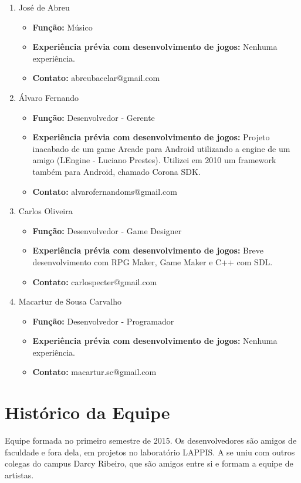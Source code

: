 \documentclass[11pt]{article}
\begin{document}
\begin{enumerate}
\item José de Abreu

\begin{itemize}
\item \textbf{Função:} Músico
\item \textbf{Experiência prévia com desenvolvimento de jogos:}
	Nenhuma experiência.
\item \textbf{Contato:} abreubacelar@gmail.com
\end{itemize}

\item Álvaro Fernando

\begin{itemize}
\item \textbf{Função:} Desenvolvedor - Gerente
\item \textbf{Experiência prévia com desenvolvimento de jogos:} 	
	Projeto inacabado de um game Arcade para Android utilizando a engine de
	um amigo (LEngine - Luciano Prestes). Utilizei em 2010 um framework também
	para Android, chamado Corona SDK.
\item \textbf{Contato:} alvarofernandoms@gmail.com
\end{itemize}

\item Carlos Oliveira

\begin{itemize}
\item \textbf{Função:} Desenvolvedor - Game Designer
\item \textbf{Experiência prévia com desenvolvimento de jogos:}
	Breve desenvolvimento com RPG Maker, Game Maker e C++ com SDL.
\item \textbf{Contato:} carlospecter@gmail.com
\end{itemize}

\item Macartur de Sousa Carvalho

\begin{itemize}
\item \textbf{Função:} Desenvolvedor - Programador
\item \textbf{Experiência prévia com desenvolvimento de jogos:}
	Nenhuma experiência.
\item \textbf{Contato:} macartur.sc@gmail.com
\end{itemize}

\end{enumerate}

\section{Histórico da Equipe}
 Equipe formada no primeiro semestre de 2015. Os desenvolvedores são amigos
 de faculdade e fora dela, em projetos no laboratório LAPPIS. A se uniu com
 outros colegas do campus Darcy Ribeiro, que são amigos entre si e formam a
 equipe de artistas.
 
\end{document}
